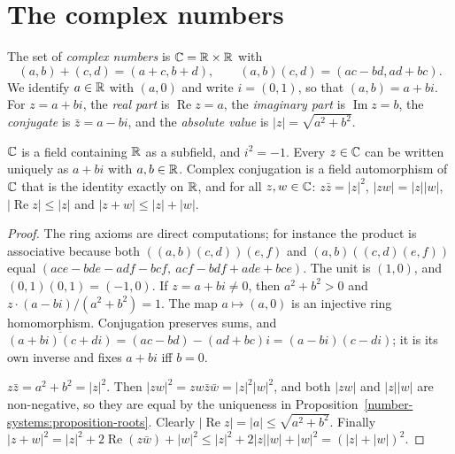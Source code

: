 \section{The complex numbers}\label{number-systems:section-complex}

\begin{definition}\label{number-systems:definition-complex}
The set of \emph{complex numbers} is $\mathbb{C} = \mathbb{R} \times \mathbb{R}$ with
\[
(a, b) + (c, d) = (a + c, b + d), \qquad (a, b)(c, d) = (ac - bd, ad + bc).
\]
We identify $a \in \mathbb{R}$ with $(a, 0)$ and write $i = (0, 1)$, so that
$(a, b) = a + bi$. For $z = a + bi$, the \emph{real part} is $\operatorname{Re} z = a$,
the \emph{imaginary part} is $\operatorname{Im} z = b$, the \emph{conjugate} is
$\bar z = a - bi$, and the \emph{absolute value} is $|z| = \sqrt{a^2 + b^2}$.
\end{definition}

\begin{theorem}\label{number-systems:theorem-complex}
$\mathbb{C}$ is a field containing $\mathbb{R}$ as a subfield, and $i^2 = -1$. Every
$z \in \mathbb{C}$ can be written uniquely as $a + bi$ with $a, b \in \mathbb{R}$. Complex
conjugation is a field automorphism of $\mathbb{C}$ that is the identity exactly on
$\mathbb{R}$, and for all $z, w \in \mathbb{C}$:
$z \bar z = |z|^2$, $|zw| = |z||w|$, $|\operatorname{Re} z| \leq |z|$ and
$|z + w| \leq |z| + |w|$.
\end{theorem}

\begin{proof}
The ring axioms are direct computations; for instance the product is
associative because both $((a,b)(c,d))(e,f)$ and $(a,b)((c,d)(e,f))$ equal
$(ace - bde - adf - bcf,\ acf - bdf + ade + bce)$. The unit is $(1, 0)$, and
$(0,1)(0,1) = (-1, 0)$. If $z = a + bi \neq 0$, then $a^2 + b^2 > 0$ and
$z \cdot (a - bi)/(a^2 + b^2) = 1$. The map $a \mapsto (a, 0)$ is an injective ring
homomorphism. Conjugation preserves sums, and
$\overline{(a + bi)(c + di)} = (ac - bd) - (ad + bc)i = (a - bi)(c - di)$; it is
its own inverse and fixes $a + bi$ iff $b = 0$.

$z \bar z = a^2 + b^2 = |z|^2$. Then $|zw|^2 = zw\bar z\bar w = |z|^2|w|^2$, and
both $|zw|$ and $|z||w|$ are non-negative, so they are equal by the uniqueness
in Proposition~\ref{number-systems:proposition-roots}. Clearly
$|\operatorname{Re} z| = |a| \leq \sqrt{a^2 + b^2}$. Finally
$|z + w|^2 = |z|^2 + 2\operatorname{Re}(z \bar w) + |w|^2 \leq |z|^2 + 2|z||w| + |w|^2 = (|z| + |w|)^2$.
\end{proof}

